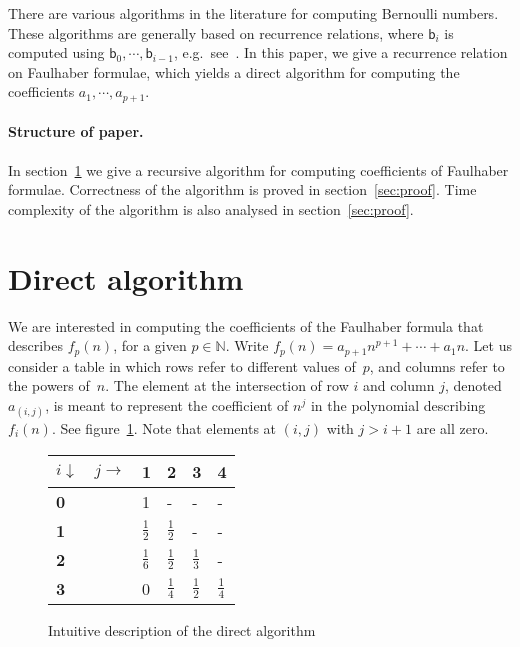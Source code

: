 \documentclass[a4paper,10pt]{amsart}
\theoremstyle{remark}
\newcommand{\nat}{\mathbb{N}}
\begin{document}
There are various algorithms in the literature for computing Bernoulli
numbers.  These algorithms are generally based on recurrence
relations, where $\mathsf{b}_i$ is computed using $\mathsf{b}_0,
\cdots,\mathsf{b}_{i-1}$, e.g.\ see~\cite{kb,ad}.  In this paper, we
give a recurrence relation on Faulhaber formulae, which yields a
direct algorithm for computing the coefficients $a_1,\cdots,a_{p+1}$.



\paragraph{Structure of paper.}
In section~\ref{sec:algorithm} we give a recursive algorithm for
computing coefficients of Faulhaber formulae. Correctness of the
algorithm is proved in section~\ref{sec:proof}. Time complexity of the
algorithm is also analysed in section~\ref{sec:proof}.

\section{Direct algorithm} 
\label{sec:algorithm}
We are interested in computing the coefficients of the Faulhaber
formula that describes $f_p(n)$, for a given $p\in\nat$.  Write
$f_p(n)=a_{p+1} n^{p+1}+\cdots+a_1 n$.
Let us consider a table in which rows refer to different values
of~$p$, and columns refer to the powers of~$n$. The element at the
intersection of row $i$ and column $j$, denoted $a_{(i,j)}$, is meant
to represent the coefficient of $n^j$ in the polynomial describing
$f_i(n)$. See figure~\ref{fig:int}. Note that elements at $(i,j)$ with
$j>i+1$ are all zero.





\begin{figure}[h]
\begin{center}
\begin{tabular}{|l||l|l|l|l|}
\hline
$i\downarrow\quad j\to$&{\bf 1} & {\bf 2} & {\bf 3} & {\bf 4}\\
\hline
\hline
{\bf 0}&1 & - & - & -\\
\hline
{\bf 1}&$\frac{1}{2}$ & $\frac{1}{2}$ & - & -\\
\hline
{\bf 2}&$\frac{1}{6}$ & $\frac{1}{2}$ & $\frac{1}{3}$&-\\
\hline
{\bf 3}&0 & $\frac{1}{4}$ & $\frac{1}{2}$ & $\frac{1}{4}$\\
\hline
\end{tabular}
\end{center}
\caption{Intuitive description of the direct algorithm}
\label{fig:int}
\end{figure}
\end{document}
